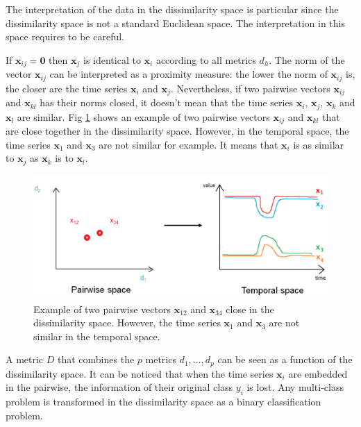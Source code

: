 The interpretation of the data in the dissimilarity space is particular since the dissimilarity space is not a standard Euclidean space. The interpretation in this space requires to be careful.

If $\textbf{x}_{ij}=\textbf{0}$ then $\textbf{x}_{j}$ is identical to $\textbf{x}_{i}$ according to all metrics $d_h$. The norm of the vector $\textbf{x}_{ij}$ can be interpreted as a proximity measure: the lower the norm of $\textbf{x}_{ij}$ is, the closer are the time series $\textbf{x}_{i}$ and $\textbf{x}_{j}$. Nevertheless, if two pairwise vectors $\textbf{x}_{ij}$ and $\textbf{x}_{kl}$ has their norms closed, it doesn't mean that the time series $\textbf{x}_{i}$, $\textbf{x}_{j}$, $\textbf{x}_{k}$ and $\textbf{x}_{l}$ are similar. Fig \ref{fig:ContreExample} shows an example of two pairwise vectors $\textbf{x}_{ij}$ and $\textbf{x}_{kl}$ that are close together in the dissimilarity space. However, in the temporal space, the time series $\textbf{x}_{1}$ and $\textbf{x}_{3}$ are not similar for example. It means that $\textbf{x}_i$ is as similar to $\textbf{x}_j$ as $\textbf{x}_k$ is to $\textbf{x}_l$.

\begin{figure}[h!]
\centering
\includegraphics[width=1\linewidth]{images/ContreExample}
\caption{Example of two pairwise vectors $\textbf{x}_{12}$ and $\textbf{x}_{34}$ close in the dissimilarity space. However, the time series $\textbf{x}_{1}$ and $\textbf{x}_{3}$ are not similar in the temporal space.}
\label{fig:ContreExample}
\end{figure}

A metric $D$ that combines the $p$ metrics $d_1, \ldots, d_p$ can be seen as a function of the dissimilarity space. It can be noticed that when the time series $\textbf{x}_i$ are embedded in the pairwise, the information of their original class $y_i$ is lost. Any multi-class problem is transformed in the dissimilarity space as a binary classification problem.

